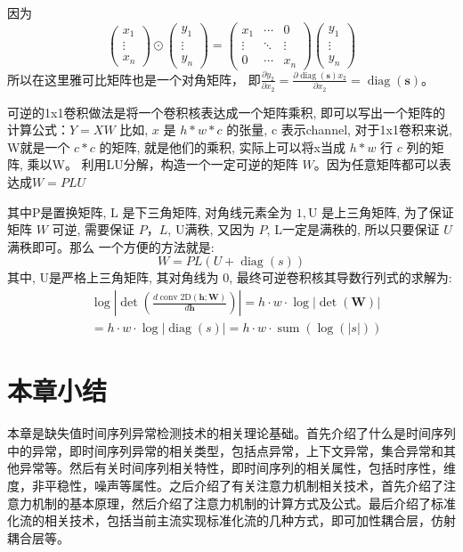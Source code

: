 因为
\begin{equation}
    \left(\begin{array}{c}
        x_1 \\
        \vdots \\
        x_n
        \end{array}\right) \odot\left(\begin{array}{c}
        y_1 \\
        \vdots \\
        y_n
        \end{array}\right)=\left(\begin{array}{ccc}
        x_1 & \cdots & 0 \\
        \vdots & \ddots & \vdots \\
        0 & \cdots & x_n
        \end{array}\right)\left(\begin{array}{c}
        y_1 \\
        \vdots \\
        y_n
        \end{array}\right)
\end{equation}
所以在这里雅可比矩阵也是一个对角矩阵， 即$\frac{\partial y_2}{\partial x_2}=\frac{\partial \operatorname{diag}(\mathbf{s}) x_2}{\partial x_2}=\operatorname{diag}(\mathbf{s})$。

可逆的1x1卷积做法是将一个卷积核表达成一个矩阵乘积, 即可以写出一个矩阵的计算公式：$Y=XW$
比如, $x$ 是 $h * w * c$ 的张量, $\mathrm{c}$ 表示channel, 对于1x1卷积来说, W就是一个 $c * c$ 的矩阵, 就是他们的乘积, 实际上可以将x当成 $h * w$ 行 $c$ 列的矩阵, 乘以W。
利用LU分解，构造一个一定可逆的矩阵 $W$。因为任意矩阵都可以表达成$W=PLU$

其中P是置换矩阵, $\mathrm{L}$ 是下三角矩阵, 对角线元素全为 $1, \mathrm{U}$ 是上三角矩阵, 为了保证矩阵 $W$ 可逆, 需要保证 $P ， L$, U满秩, 又因为 $P$, L一定是满秩的, 所以只要保证 $U$ 满秩即可。那么 一个方便的方法就是:
\begin{equation}
    W=P L(U+\operatorname{diag}(s))
\end{equation}
其中, U是严格上三角矩阵, 其对角线为 0, 最终可逆卷积核其导数行列式的求解为:
\begin{equation}
    \begin{aligned}
        &\log \left|\operatorname{det}\left(\frac{d \operatorname{conv} 2 \mathrm{D}(\mathbf{h} ; \mathbf{W})}{d \mathbf{h}}\right)\right|=h \cdot w \cdot \log |\operatorname{det}(\mathbf{W})| \\
        &=h \cdot w \cdot \log |\operatorname{diag}(s)|=h \cdot w \cdot \operatorname{sum}(\log (|s|))
        \end{aligned}
\end{equation}

\section{本章小结}
本章是缺失值时间序列异常检测技术的相关理论基础。首先介绍了什么是时间序列中的异常，即时间序列异常的相关类型，包括点异常，上下文异常，集合异常和其他异常等。然后有关时间序列相关特性，即时间序列的相关属性，包括时序性，维度，非平稳性，噪声等属性。之后介绍了有关注意力机制相关技术，首先介绍了注意力机制的基本原理，然后介绍了注意力机制的计算方式及公式。最后介绍了标准化流的相关技术，包括当前主流实现标准化流的几种方式，即可加性耦合层，仿射耦合层等。